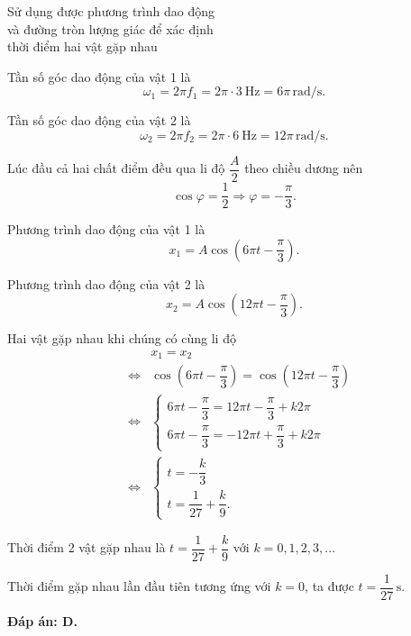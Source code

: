 \begin{dang}{Sử dụng được phương trình dao động\\ và đường tròn lượng giác để xác định\\ thời điểm hai vật gặp nhau}
{		Tần số góc dao động của vật 1 là
		\begin{equation*}
			\omega_1=2\pi f_1=2\pi\cdot\SI{3}{\hertz}=6\pi\,\text{rad/s}.
		\end{equation*}
		
		Tần số góc dao động của vật 2 là
		\begin{equation*}
			\omega_2=2\pi f_2=2\pi\cdot\SI{6}{\hertz}=12\pi\,\text{rad/s}.
		\end{equation*}
		
		Lúc đầu cả hai chất điểm đều qua li độ $\dfrac{A}{2}$ theo chiều dương nên
		\begin{equation*}
			\cos\varphi=\dfrac{1}{2}\Rightarrow\varphi=-\dfrac{\pi}{3}.
		\end{equation*}
		
		Phương trình dao động của vật 1 là
		\begin{equation*}
			x_1=A\cos(6\pi t-\dfrac{\pi}{3}).
		\end{equation*}
		
		Phương trình dao động của vật 2 là
		\begin{equation*}
			x_2=A\cos(12\pi t-\dfrac{\pi}{3}).
		\end{equation*}
		
		Hai vật gặp nhau khi chúng có cùng li độ
		\begin{eqnarray*}
			&&x_1=x_2\\
			&\Leftrightarrow&\cos(6\pi t-\dfrac{\pi}{3})=\cos(12\pi t-\dfrac{\pi}{3})\\
			&\Leftrightarrow&
			\begin{cases}
				6\pi t-\dfrac{\pi}{3}=12\pi t-\dfrac{\pi}{3}+k2\pi\\
				6\pi t-\dfrac{\pi}{3}=-12\pi t+\dfrac{\pi}{3}+k2\pi
			\end{cases}\\
			&\Leftrightarrow&
			\begin{cases}
				t=-\dfrac{k}{3}\\
				t=\dfrac{1}{27}+\dfrac{k}{9}.
			\end{cases}
		\end{eqnarray*}
		
		Thời điểm 2 vật gặp nhau là $t=\dfrac{1}{27}+\dfrac{k}{9}$ với $k=0,1,2,3,...$
		
		Thời điểm gặp nhau lần đầu tiên tương ứng với $k=0$, ta được $t=\dfrac{1}{27}\,\text{s}$.
		
		\textbf{Đáp án: D.}
	}
	
\end{dang}
